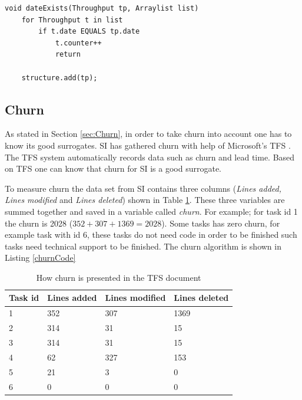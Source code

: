 \documentclass[UKenglish]{ifimaster}  %
\begin{document}
\begin{minipage}{\textwidth}
\begin{lstlisting}[caption=Pseudocode example of how throughput is measured, label=throughputCode]
void dateExists(Throughput tp, Arraylist list)
	for Throughput t in list
		if t.date EQUALS tp.date
			t.counter++
			return
			
	structure.add(tp);
\end{lstlisting}
 \end{minipage}


\subsection{Churn}
\label{sec:churn}
As stated in Section \ref{sec:Churn}, in order to take churn into account one has to know its good surrogates. SI has gathered churn with help of Microsoft's TFS \parencite{Dag}. The TFS system automatically records data such as churn and lead time. Based on TFS one can know that churn for SI is a good surrogate.

To measure churn the data set from SI contains three columns (\textit{Lines added, Lines modified} and \textit{Lines deleted}) shown in Table \ref{table:churn}. These three variables are summed together and saved in a  variable called \textit{churn}.  For example; for task id 1 the churn is 2028 ($352+307+1369 = 2028$). Some tasks has zero churn, for example task with id 6, these tasks do not need code in order to be finished such tasks need technical support to be finished. The churn algorithm is shown in Listing \ref{churnCode}

\begin{table}[!ht]
\begin{center}
\caption{How churn is presented in the TFS document}
    \begin{tabular}{| l | l | l | l |}
    \hline
\bf{Task id} & \bf{Lines added} & \bf{Lines modified}  & \bf{Lines deleted} \\ \hline
1&352&307&1369\\ \hline
2&314 & 31 & 15 \\ \hline
3&314&31 & 15\\ \hline
4&62&327&153 \\ \hline
5&21&3&0 \\ \hline
6&0&0&0 \\ \hline
\end{tabular}
\label{table:churn} %
\end{center}
\end{table}
\end{document}

